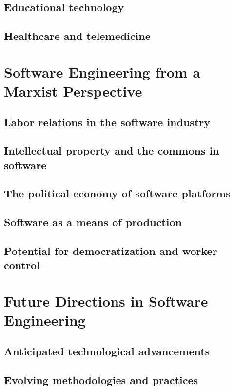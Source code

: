 \begin{refsection}
\begin{multicols}{2}
{\subsection{Educational technology}
\subsection{Healthcare and telemedicine}

}
\newpage
\end{multicols}
\section{Software Engineering from a Marxist Perspective}
\begin{multicols}{2}
{\small

\subsection{Labor relations in the software industry}
\subsection{Intellectual property and the commons in software}
\subsection{The political economy of software platforms}
\subsection{Software as a means of production}
\subsection{Potential for democratization and worker control}

}
\newpage
\end{multicols}
\section{Future Directions in Software Engineering}
\begin{multicols}{2}
{\small

\subsection{Anticipated technological advancements}
\subsection{Evolving methodologies and practices}
}
\end{multicols}
\end{refsection}
